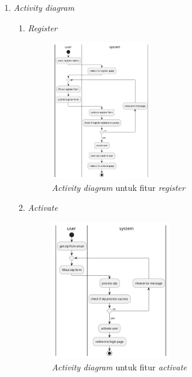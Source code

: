 \documentclass[a4paper]{article}
\begin{document}
\begin{enumerate}
\begin{enumerate}
        \newpage



    \end{enumerate}
    \newpage
    \item \textit{Activity diagram}

    \begin{enumerate}
        \item \textit{Register}\\
        \begin{figure}[h]
            \centering
            \includegraphics*[height=6cm]{diagram/activity diagram/1. register/register.png}
            \caption{\textit{Activity diagram} untuk fitur \textit{register}}
        \end{figure}
        \item \textit{Activate}\\
        \begin{figure}[h]
            \centering
            \includegraphics*[height=6cm]{diagram/activity diagram/2. activate/activate user.png}
            \caption{\textit{Activity diagram} untuk fitur \textit{activate}}
        \end{figure}
        \newpage


\end{enumerate}
\end{enumerate}
\end{document}
